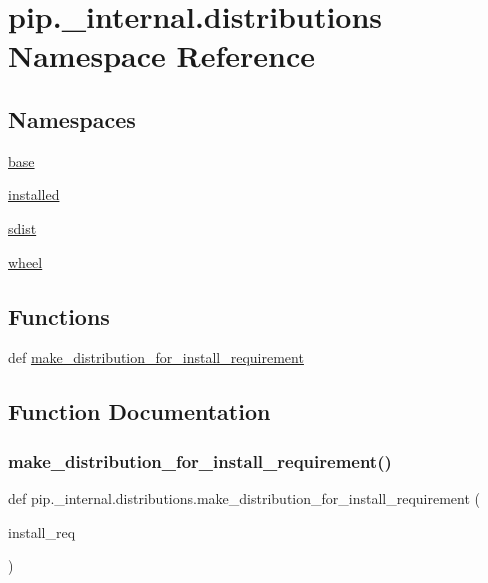\hypertarget{namespacepip_1_1__internal_1_1distributions}{}\section{pip.\+\_\+internal.\+distributions Namespace Reference}
\label{namespacepip_1_1__internal_1_1distributions}
\subsection*{Namespaces}
\begin{DoxyCompactItemize}
\item 
 \hyperlink{namespacepip_1_1__internal_1_1distributions_1_1base}{base}
\item 
 \hyperlink{namespacepip_1_1__internal_1_1distributions_1_1installed}{installed}
\item 
 \hyperlink{namespacepip_1_1__internal_1_1distributions_1_1sdist}{sdist}
\item 
 \hyperlink{namespacepip_1_1__internal_1_1distributions_1_1wheel}{wheel}
\end{DoxyCompactItemize}
\subsection*{Functions}
\begin{DoxyCompactItemize}
\item 
def \hyperlink{namespacepip_1_1__internal_1_1distributions_a64c482771770bf2e094b697f00da5923}{make\+\_\+distribution\+\_\+for\+\_\+install\+\_\+requirement}
\end{DoxyCompactItemize}


\subsection{Function Documentation}
\mbox{\label{namespacepip_1_1__internal_1_1distributions_a64c482771770bf2e094b697f00da5923}} 
\subsubsection{\texorpdfstring{make\+\_\+distribution\+\_\+for\+\_\+install\+\_\+requirement()}{make\_distribution\_for\_install\_requirement()}}
{\footnotesize\ttfamily def pip.\+\_\+internal.\+distributions.\+make\+\_\+distribution\+\_\+for\+\_\+install\+\_\+requirement (\begin{DoxyParamCaption}\item[{}]{install\+\_\+req }\end{DoxyParamCaption})}

